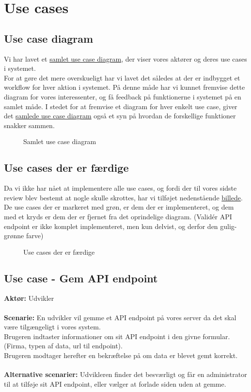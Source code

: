 \section{Use cases}
\subsection{Use case diagram}
Vi har lavet et \hyperref[fig:usecase-complete]{samlet use case diagram}, der viser vores aktører og deres use cases i systemet.\\
For at gøre det mere overskueligt har vi lavet det således at der er indbygget et workflow for hver aktion i systemet.
På denne måde har vi kunnet fremvise dette diagram for vores interessenter, og få feedback på funktionerne i systemet på en samlet måde.
I stedet for at fremvise et diagram for hver enkelt use case, giver det \hyperref[fig:usecase-complete]{samlede use case diagram} også et syn på hvordan de forskellige funktioner snakker sammen.
\begin{figure}[H]
    \caption{Samlet use case diagram}
    \label{fig:usecase-complete}
\end{figure}
\subsection{Use cases der er færdige}
Da vi ikke har nået at implementere alle use cases, og fordi der til vores sidste review blev bestemt at nogle skulle skrottes,
har vi tilføjet nedenstående \hyperref[fig:usecase-done]{billede}.
\\
De use cases der er markeret med grøn, er dem der er implementeret, og dem med et kryds er dem der er fjernet fra det oprindelige diagram.
(Validér API endpoint er ikke komplet implementeret, men kun delvist, og derfor den gulig-grønne farve)
\begin{figure}[H]
    \caption{Use cases der er færdige}
    \label{fig:usecase-done}
\end{figure}
\subsection{Use case - Gem API endpoint}
\textbf{Aktør:} Udvikler
\\\\
\textbf{Scenarie:} En udvikler vil gemme et API endpoint på vores server da det skal være tilgængeligt i vores system. \\
Brugeren indtaster informationer om sit API endpoint i den givne formular. (Firma, typen af data, url til endpoint). \\
Brugeren modtager herefter en bekræftelse på om data er blevet gemt korrekt.
\\\\
\textbf{Alternative scenarier:} Udvikleren finder det besværligt og får en administrator til at tilføje sit API endpoint,
eller vælger at forlade siden uden at gemme.
